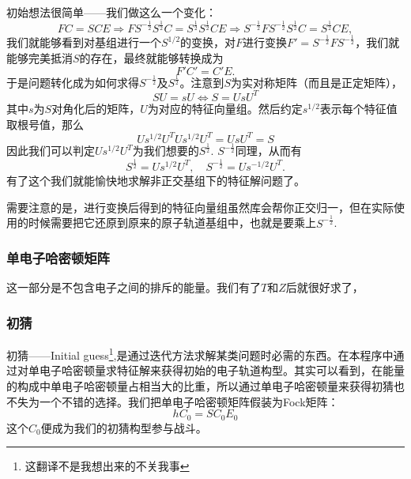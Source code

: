 \documentclass[12pt,a4paper,openany,twoside]{article}
\numberwithin{equation}{section}
\begin{document}
                初始想法很简单——我们做这么一个变化：
                \[
                    FC = SCE \Rightarrow F S^{-\frac{1}{2}}S^{\frac{1}{2}} C = S^{\frac{1}{2}}S^{\frac{1}{2}} C E \Rightarrow S^{-\frac{1}{2}} F S^{-\frac{1}{2}} S^{\frac{1}{2}}C = S^{\frac{1}{2}} C E,
                \] 
                我们就能够看到对基组进行一个$S^{1/2}$的变换，对$F$进行变换$F' = S^{-\frac{1}{2}} F S^{-\frac{1}{2}}$，我们就能够完美抵消$S$的存在，最终就能够转换成为
                \begin{equation}
                    F' C' = C' E.
                \end{equation}
                于是问题转化成为如何求得$S^{-\frac{1}{2}}$及$S^{\frac{1}{2}}$。注意到$S$为实对称矩阵（而且是正定矩阵），
                \begin{equation}
                    S U = s U \Leftrightarrow S = U s U^{T}
                \end{equation}
                其中$s$为$S$对角化后的矩阵，$U$为对应的特征向量组。然后约定$s^{1/2}$表示每个特征值取根号值，那么
                \begin{equation}
                    U s^{1/2} U^{T} U s^{1/2} U^{T} = U s U^{T} = S
                \end{equation}
                因此我们可以判定$U s^{1/2} U^{T}$为我们想要的$S^{\frac{1}{2}}$. $S^{-\frac{1}{2}}$同理，从而有
                \begin{equation}
                    S^{\frac{1}{2}} = U s^{1/2} U^{T}, \quad S^{-\frac{1}{2}} =  U s^{-1/2} U^{T}.
                \end{equation}
                有了这个我们就能愉快地求解非正交基组下的特征解问题了。

                需要注意的是，进行变换后得到的特征向量组虽然库会帮你正交归一，但在实际使用的时候需要把它还原到原来的原子轨道基组中，也就是要乘上$S^{-\frac{1}{2}}$.


                \subsubsection{单电子哈密顿矩阵}
                这一部分是不包含电子之间的排斥的能量。我们有了$T$和$Z$后就很好求了，
                \subsubsection{初猜}
                初猜——Initial guess\footnote{这翻译不是我想出来的不关我事},是通过迭代方法求解某类问题时必需的东西。在本程序中通过对单电子哈密顿量求特征解来获得初始的电子轨道构型。其实可以看到，在能量的构成中单电子哈密顿量占相当大的比重，所以通过单电子哈密顿量来获得初猜也不失为一个不错的选择。我们把单电子哈密顿矩阵假装为Fock矩阵：
                \begin{equation}
                    h C_0 = S C_0 E_0
                \end{equation}
                这个$C_0$便成为我们的初猜构型参与战斗。
\end{document}
